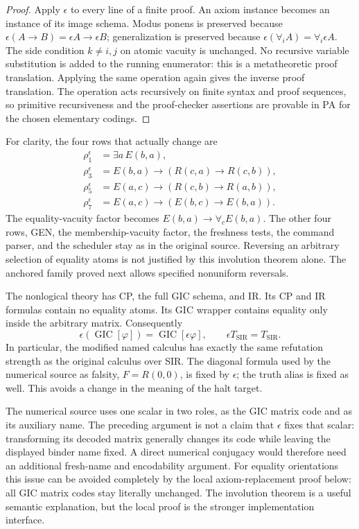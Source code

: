 \begin{proof}
Apply $\epsilon$ to every line of a finite proof.  An axiom instance
becomes an instance of its image schema.  Modus ponens is preserved
because $\epsilon(A\to B)=\epsilon A\to\epsilon B$;
generalization is preserved because
$\epsilon(\forall_i A)=\forall_i\epsilon A$.
The side condition $k\ne i,j$ on atomic vacuity is unchanged.
No recursive variable substitution is added to the running enumerator:
this is a metatheoretic proof translation.  Applying the same operation
again gives the inverse proof translation.  The operation acts
recursively on finite syntax and proof sequences, so primitive
recursiveness and the proof-checker assertions are provable in PA
for the chosen elementary codings.
\end{proof}

For clarity, the four rows that actually change are
\[
\begin{aligned}
 \rho_1^\epsilon&=\exists a\,E(b,a),\\
 \rho_3^\epsilon&=E(b,a)\to(R(c,a)\to R(c,b)),\\
 \rho_5^\epsilon&=E(a,c)\to(R(c,b)\to R(a,b)),\\
 \rho_7^\epsilon&=E(a,c)\to(E(b,c)\to E(b,a)).
\end{aligned}
\]
The equality-vacuity factor becomes
$E(b,a)\to\forall_cE(b,a)$.
The other four rows, GEN, the membership-vacuity factor, the
freshness tests, the command parser, and the scheduler stay as in the
original source.  Reversing an arbitrary selection of equality atoms
is not justified by this involution theorem alone.  The anchored family
proved next allows specified nonuniform reversals.

The nonlogical theory has CP, the full GIC schema, and IR.  Its CP
and IR formulas contain no equality atoms.  Its GIC wrapper contains
equality only inside the arbitrary matrix.  Consequently
\[
 \epsilon(\operatorname{GIC}[\varphi])
       =\operatorname{GIC}[\epsilon\varphi],
 \qquad \epsilon T_{\mathrm{SIR}}=T_{\mathrm{SIR}}.
\]
In particular, the modified named calculus has exactly the same
refutation strength as the original calculus over SIR.  The
diagonal formula used by the numerical source as falsity,
$F=R(0,0)$, is fixed by $\epsilon$; the truth alias is fixed as well.
This avoids a change in the meaning of the halt target.

The numerical source uses one scalar in two roles, as the GIC matrix
code and as its auxiliary name.  The preceding argument is not a
claim that $\epsilon$ fixes that scalar: transforming its decoded
matrix generally changes its code while leaving the displayed binder
name fixed.  A direct numerical conjugacy would therefore need an
additional fresh-name and encodability argument.  For equality
orientations this issue can be avoided completely by the local
axiom-replacement proof below: all GIC matrix codes stay literally
unchanged.  The involution theorem is a useful semantic explanation,
but the local proof is the stronger implementation interface.

